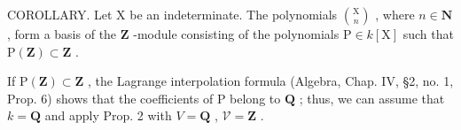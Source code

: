 COROLLARY. Let \(\mathrm{X}\) be an indeterminate. The polynomials \(\binom{\mathrm{X}}{n}\) , where \(n \in \mathbf{N}\) , form a basis of the \(\mathbf{Z}\) -module consisting of the polynomials \(\mathrm{P} \in k[\mathrm{X}]\) such that \(\mathrm{P}(\mathbf{Z}) \subset \mathbf{Z}\) .

If \(\mathrm{P}(\mathbf{Z}) \subset \mathbf{Z}\) , the Lagrange interpolation formula (Algebra, Chap. IV, §2, no. 1, Prop. 6) shows that the coefficients of P belong to \(\mathbf{Q}\) ; thus, we can assume that \(k = \mathbf{Q}\) and apply Prop. 2 with \(V = \mathbf{Q}\) , \(\mathcal{V} = \mathbf{Z}\) .

